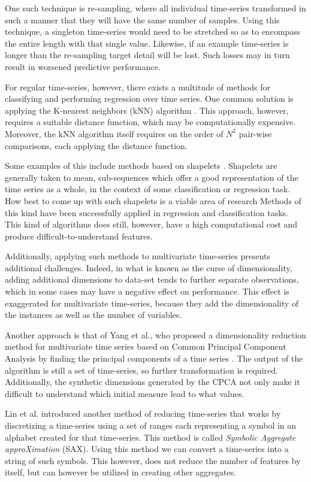 \documentclass[conference]{IEEEtran}
\begin{document}
One such technique is re-sampling, where all individual time-series transformed in such a manner that they will have the same number of samples. Using this technique, a singleton time-series would need to be stretched so as to encompass the entire length with that single value. Likewise, if an example time-series is longer than the re-sampling target detail will be lost. Such losses may in turn result in worsened predictive performance.

For regular time-series, however, there exists a multitude of methods for classifying and performing regression over time series. One common solution is applying the K-nearest neighbors (kNN) algorithm \cite{altman1992}. This approach, however, requires a suitable distance function, which may be computationally expensive. Moreover, the kNN algorithm itself requires on the order of $N^2$ pair-wise comparisons, each applying the distance function.

Some examples of this include methods based on shapelets \cite{ye2009time,ye2011shapelets}. Shapelets are generally taken to mean, sub-sequences which offer a good representation of the time series as a whole, in the context of some classification or regression task. How best to come up with such shapelets is a viable area of research Methods of this kind have been successfully applied in regression and classification tasks. This kind of algorithms does still, however, have a high computational cost and produce difficult-to-understand features.

Additionally, applying such methods to multivariate time-series presents additional challenges. Indeed, in what is known as the curse of dimensionality, adding additional dimensions to data-set tends to further separate observations, which in some cases may have a negative effect on performance. This effect is exaggerated for multivariate time-series, because they add the dimensionality of the instances as well as the number of variables.

Another approach is that of Yang et al., who proposed a dimensionality reduction method for multivariate time series based on Common Principal Component Analysis by finding the principal components of a time series \cite{yang2005clever}. The output of the algorithm is still a set of time-series, so further transformation is required. Additionally, the synthetic dimensions generated by the CPCA not only make it difficult to understand which initial measure lead to what values.

Lin et al. introduced another method of reducing time-series that works by discretizing a time-series using a set of ranges each representing a symbol in an alphabet created for that time-series. This method is called \emph{Symbolic Aggregate approXimation} (SAX). Using this method we can convert a time-series into a string of such symbols. This however, does not reduce the number of features by itself, but can however be utilized in creating other aggregates. \cite{lin2003sax}
\end{document}
